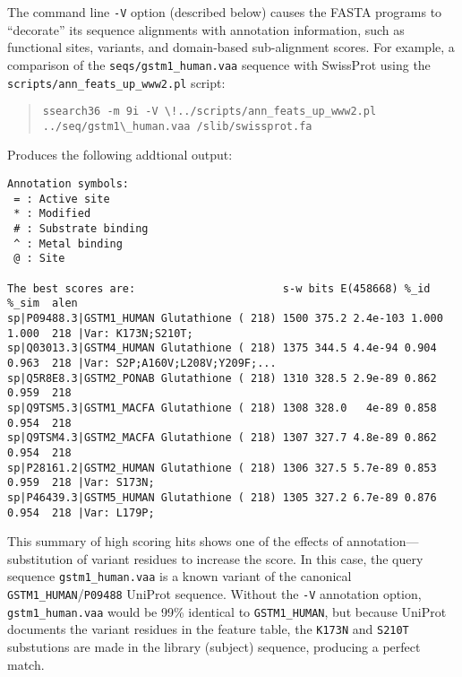 \documentclass[11pt]{article}
\begin{document}
The command line \texttt{-V} option (described below) causes the FASTA
programs to ``decorate'' its sequence alignments with annotation
information, such as functional sites, variants, and domain-based
sub-alignment scores.  For example, a comparison of the
\texttt{seqs/gstm1\_human.vaa} sequence with SwissProt using the
\texttt{scripts/ann\_feats\_up\_www2.pl} script:
\begin{footnotesize}
\begin{quote}
\begin{verbatim}
ssearch36 -m 9i -V \!../scripts/ann_feats_up_www2.pl ../seq/gstm1\_human.vaa /slib/swissprot.fa
\end{verbatim}
\end{quote}
\end{footnotesize}
Produces the following addtional output:
\begin{footnotesize}
\begin{verbatim}
Annotation symbols:
 = : Active site
 * : Modified
 # : Substrate binding
 ^ : Metal binding
 @ : Site

The best scores are:                       s-w bits E(458668) %_id  %_sim  alen
sp|P09488.3|GSTM1_HUMAN Glutathione ( 218) 1500 375.2 2.4e-103 1.000 1.000  218 |Var: K173N;S210T;
sp|Q03013.3|GSTM4_HUMAN Glutathione ( 218) 1375 344.5 4.4e-94 0.904 0.963  218 |Var: S2P;A160V;L208V;Y209F;...
sp|Q5R8E8.3|GSTM2_PONAB Glutathione ( 218) 1310 328.5 2.9e-89 0.862 0.959  218
sp|Q9TSM5.3|GSTM1_MACFA Glutathione ( 218) 1308 328.0   4e-89 0.858 0.954  218
sp|Q9TSM4.3|GSTM2_MACFA Glutathione ( 218) 1307 327.7 4.8e-89 0.862 0.954  218
sp|P28161.2|GSTM2_HUMAN Glutathione ( 218) 1306 327.5 5.7e-89 0.853 0.959  218 |Var: S173N;
sp|P46439.3|GSTM5_HUMAN Glutathione ( 218) 1305 327.2 6.7e-89 0.876 0.954  218 |Var: L179P;
\end{verbatim}
\end{footnotesize}
This summary of high scoring hits shows one of the effects of
annotation---substitution of variant residues to increase the score.
In this case, the query sequence \texttt{gstm1\_human.vaa} is a known
variant of the canonical \texttt{GSTM1\_HUMAN}/\texttt{P09488} UniProt
sequence.  Without the \texttt{-V} annotation option,
\texttt{gstm1\_human.vaa} would be 99\% identical to
\texttt{GSTM1\_HUMAN}, but because UniProt documents the variant
residues in the feature table, the \texttt{K173N} and \texttt{S210T}
substutions are made in the library (subject) sequence, producing a
perfect match.
\end{document}
